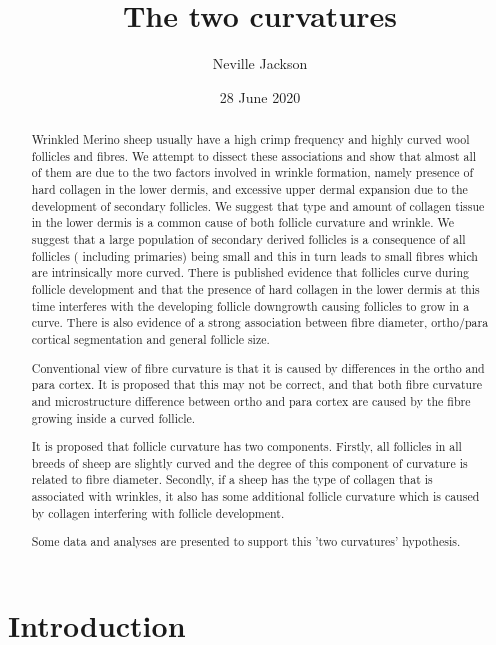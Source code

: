 \documentclass{article}
\begin{document}
\title{The two curvatures}
\author{Neville Jackson}
\date{28 June 2020}

\maketitle

\begin{abstract}

Wrinkled Merino sheep usually have a high crimp frequency and highly curved wool follicles and fibres.
We attempt to dissect these associations and show that almost all of them are due to the two factors involved in wrinkle formation, namely presence of hard collagen in the lower dermis, and excessive upper dermal expansion due to the development of secondary follicles.
  We suggest that type and amount of collagen tissue in the lower dermis is a common cause of both follicle curvature and wrinkle. 
  We suggest that a large population of secondary derived follicles is a consequence of all follicles ( including primaries) being small and this in turn leads to small fibres which are intrinsically more curved.
There is published evidence that follicles curve during follicle development and that the presence of hard collagen in the lower dermis at this time interferes with the developing follicle downgrowth causing follicles to grow in a curve.  
 There is also evidence of a strong association between fibre diameter, ortho/para cortical segmentation and general follicle size.

Conventional view of fibre curvature is that it is caused by differences in the ortho and para cortex. It is proposed that this may not be correct, and that both fibre curvature and microstructure difference between ortho and para cortex are caused by the fibre growing inside a curved follicle. 

It is proposed that follicle curvature has two components. Firstly, all follicles in all breeds of sheep are slightly curved and the degree of this component of curvature is related to fibre diameter. Secondly, if a sheep has the type of collagen that is associated with wrinkles, it also has some additional follicle curvature which is caused by collagen interfering with follicle development.

Some data and analyses are presented to support this 'two curvatures' hypothesis.
\end{abstract}


\section{Introduction}
\end{document}
